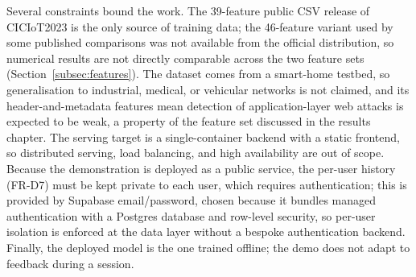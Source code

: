 \par Several constraints bound the work. The 39-feature public CSV release of CICIoT2023 is the only source of training data; the 46-feature variant used by some published comparisons was not available from the official distribution, so numerical results are not directly comparable across the two feature sets (Section~\ref{subsec:features}). The dataset comes from a smart-home testbed, so generalisation to industrial, medical, or vehicular networks is not claimed, and its header-and-metadata features mean detection of application-layer web attacks is expected to be weak, a property of the feature set discussed in the results chapter. The serving target is a single-container backend with a static frontend, so distributed serving, load balancing, and high availability are out of scope. Because the demonstration is deployed as a public service, the per-user history (FR-D7) must be kept private to each user, which requires authentication; this is provided by Supabase email/password, chosen because it bundles managed authentication with a Postgres database and row-level security, so per-user isolation is enforced at the data layer without a bespoke authentication backend. Finally, the deployed model is the one trained offline; the demo does not adapt to feedback during a session.
